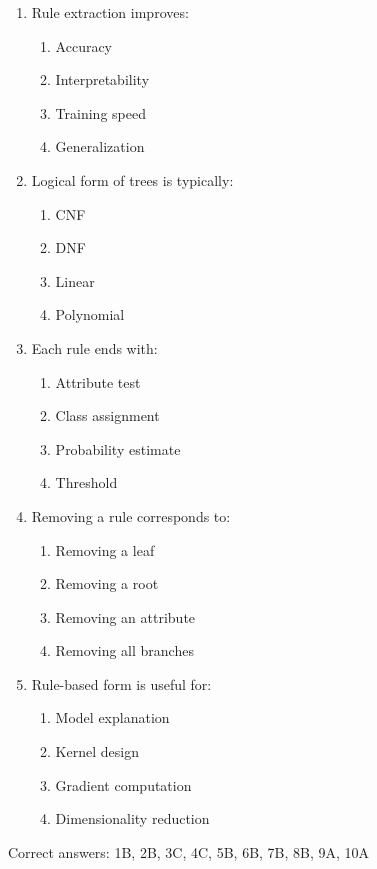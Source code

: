 \documentclass[3pt]{article}
\begin{document}
\begin{enumerate}
		\item Rule extraction improves:
		\begin{enumerate}
			\item Accuracy
			\item Interpretability
			\item Training speed
			\item Generalization
		\end{enumerate}
		
		\item Logical form of trees is typically:
		\begin{enumerate}
			\item CNF
			\item DNF
			\item Linear
			\item Polynomial
		\end{enumerate}
		
		\item Each rule ends with:
		\begin{enumerate}
			\item Attribute test
			\item Class assignment
			\item Probability estimate
			\item Threshold
		\end{enumerate}
		
		\item Removing a rule corresponds to:
		\begin{enumerate}
			\item Removing a leaf
			\item Removing a root
			\item Removing an attribute
			\item Removing all branches
		\end{enumerate}
		
		\item Rule-based form is useful for:
		\begin{enumerate}
			\item Model explanation
			\item Kernel design
			\item Gradient computation
			\item Dimensionality reduction
		\end{enumerate}
	\end{enumerate}
	
	Correct answers: 1B, 2B, 3C, 4C, 5B, 6B, 7B, 8B, 9A, 10A
	
\end{document}

